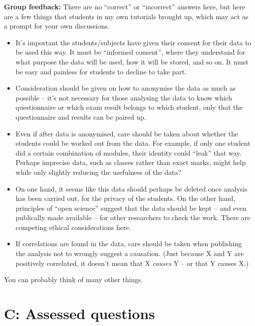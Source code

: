 \documentclass[
  a4paper,
]{book}
\providecommand{\tightlist}{%
  \setlength{\itemsep}{0pt}\setlength{\parskip}{0pt}}
\theoremstyle{definition}
\theoremstyle{definition}
\theoremstyle{definition}
\theoremstyle{definition}
\theoremstyle{remark}
\begin{document}
\begin{myanswers}
\textbf{Group feedback:} There are no ``correct'' or ``incorrect'' answers here, but here are a few things that students in my own tutorials brought up, which may act as a prompt for your own discussions.

\begin{itemize}
\tightlist
\item
  It's important the students/subjects have given their consent for their data to be used this way. It must be ``informed consent'', where they understand for what purpose the data will be used, how it will be stored, and so on. It must be easy and painless for students to decline to take part.
\item
  Consideration should be given on how to anonymise the data as much as possible -- it's not necessary for those analysing the data to know which questionnaire or which exam result belongs to which student, only that the questionnaire and results can be paired up.
\item
  Even if after data is anonymised, care should be taken about whether the students could be worked out from the data. For example, if only one student did a certain combination of modules, their identity could ``leak'' that way. Perhaps imprecise data, such as classes rather than exact marks, might help while only slightly reducing the usefulness of the data?
\item
  On one hand, it seems like this data should perhaps be deleted once analysis has been carried out, for the privacy of the students. On the other hand, principles of ``open science'' suggest that the data should be kept -- and even publically made available -- for other researchers to check the work. There are competing ethical considerations here.
\item
  If correlations are found in the data, care should be taken when publishing the analysis not to wrongly suggest a causation. (Just because X and Y are positively correlated, it doesn't mean that X \emph{causes} Y -- or that Y causes X.)
\end{itemize}

You can probably think of many other things.

\end{myanswers}

\hypertarget{P1-assessed}{%
\section*{C: Assessed questions}\label{P1-assessed}}
\end{document}
